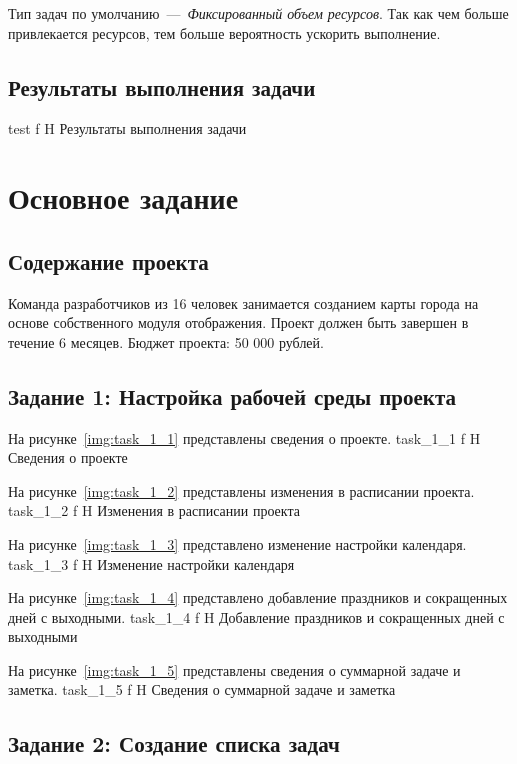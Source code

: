 Тип задач по умолчанию~---~\textit{Фиксированный объем ресурсов}.
Так как чем больше привлекается ресурсов, тем больше вероятность ускорить выполнение.

\subsection{Результаты выполнения задачи}

	{test}
	{f}
	{H}
	{\textwidth}
	{Результаты выполнения задачи}

\section{Основное задание}

\subsection{Содержание проекта}

Команда разработчиков из 16 человек занимается созданием карты города на основе собственного модуля отображения. 
Проект должен быть завершен в течение 6 месяцев. 
Бюджет проекта: 50 000 рублей.

\subsection{Задание 1: Настройка рабочей среды проекта}

На рисунке~\ref{img:task_1_1} представлены сведения о проекте.
	{task_1_1}
	{f}
	{H}
	{\textwidth}
	{Сведения о проекте}

\clearpage
На рисунке~\ref{img:task_1_2} представлены изменения в расписании проекта.
	{task_1_2}
	{f}
	{H}
	{\textwidth}
	{Изменения в расписании проекта}

На рисунке~\ref{img:task_1_3} представлено изменение настройки календаря.
	{task_1_3}
	{f}
	{H}
	{\textwidth}
	{Изменение настройки календаря}

\clearpage
На рисунке~\ref{img:task_1_4} представлено добавление праздников и сокращенных дней с выходными.
	{task_1_4}
	{f}
	{H}
	{\textwidth}
	{Добавление праздников и сокращенных дней с выходными}

\clearpage
На рисунке~\ref{img:task_1_5} представлены сведения о суммарной задаче и заметка.
	{task_1_5}
	{f}
	{H}
	{\textwidth}
	{Сведения о суммарной задаче и заметка}

\subsection{Задание 2: Создание списка задач}

